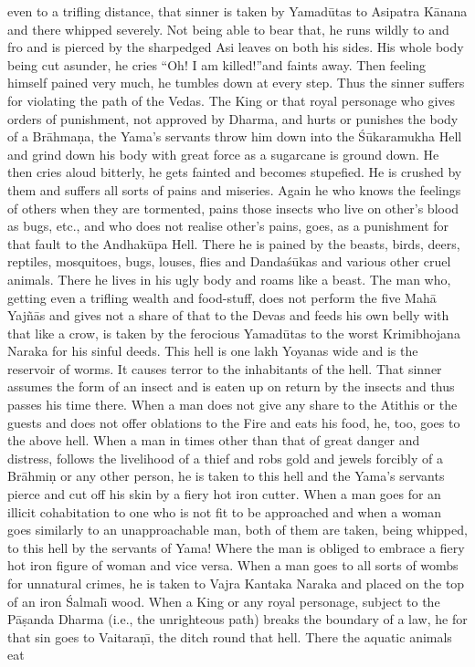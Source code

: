 even to a trifling distance, that sinner is taken by Yamad\=utas to Asipatra K\=anana and there whipped severely. Not being able to bear that, he runs wildly to and fro and is pierced by the sharpedged Asi leaves on both his sides. His whole body being cut asunder, he cries ``Oh! I am killed!''and faints away. Then feeling himself pained very much, he tumbles down at every step. Thus the sinner suffers for violating the path of the Vedas. The King or that royal personage who gives orders of punishment, not approved by Dharma, and hurts or punishes the body of a Br\=ahma\d{n}a, the Yama's servants throw him down into the \'S\=ukaramukha Hell and grind down his body with great force as a sugarcane is ground down. He then cries aloud bitterly, he gets fainted and becomes stupefied. He is crushed by them and suffers all sorts of pains and miseries. Again he who knows the feelings of others when they are tormented, pains those insects who live on other's blood as bugs, etc., and who does not realise other's pains, goes, as a punishment for that fault to the Andhak\=upa Hell. There he is pained by the beasts, birds, deers, reptiles, mosquitoes, bugs, louses, flies and Danda\'s\=ukas and various other cruel animals. There he lives in his ugly body and roams like a beast. The man who, getting even a trifling wealth and food-stuff, does not perform the five Mah\=a Yaj\~n\=as and gives not a share of that to the Devas and feeds his own belly with that like a crow, is taken by the ferocious Yamad\=utas to the worst Krimibhojana Naraka for his sinful deeds. This hell is one lakh Yoyanas wide and is the reservoir of worms. It causes terror to the inhabitants of the hell. That sinner assumes the form of an insect and is eaten up on return by the insects and thus passes his time there. When a man does not give any share to the Atithis or the guests and does not offer oblations to the Fire and eats his food, he, too, goes to the above hell. When a man in times other than that of great danger and distress, follows the livelihood of a thief and robs gold and jewels forcibly of a Br\=ahmi\d{n} or any other person, he is taken to this hell and the Yama's servants pierce and cut off his skin by a fiery hot iron cutter. When a man goes for an illicit cohabitation to one who is not fit to be approached and when a woman goes similarly to an unapproachable man, both of them are taken, being whipped, to this hell by the servants of Yama! Where the man is obliged to embrace a fiery hot iron figure of woman and vice versa. When a man goes to all sorts of wombs for unnatural crimes, he is taken to Vajra Kantaka Naraka and placed on the top of an iron \'Salmal\={\i} wood. When a King or any royal personage, subject to the P\=a\d{s}anda Dharma (i.e., the unrighteous path) breaks the boundary of a law, he for that sin goes to Vaitara\d{n}\={\i}, the ditch round that hell. There the aquatic animals eat

